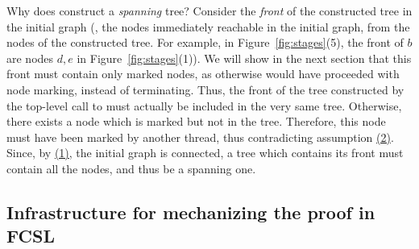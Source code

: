Why does  construct a \emph{spanning} tree? Consider the
{\em front} of the constructed tree in the initial graph (\ie, the
nodes immediately reachable in the initial graph, from the nodes of
the constructed tree. For example, in Figure~\ref{fig:stages}(5), the
front of $b$ are nodes $d, e$ in Figure~\ref{fig:stages}(1)). We will
show in the next section that this front must contain only marked
nodes, as otherwise  would have proceeded with node
marking, instead of terminating. Thus, the front of the tree
constructed by the top-level call to  must actually be
included in the very same tree. Otherwise, there exists a node which
is marked but not in the tree. Therefore, this node must have been
marked by another thread, thus contradicting assumption
\hyperlink{asm2}{(2)}. Since, by \hyperlink{asm1}{(1)}, the initial
graph is connected, a tree which contains its front must contain all
the nodes, and thus be a spanning one.



\subsection{Infrastructure for mechanizing the proof in FCSL}
\label{sec:inform-proof-devel}

